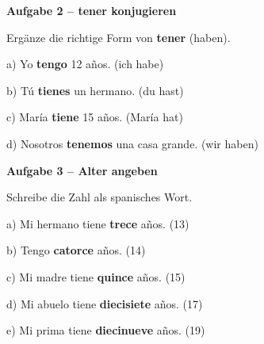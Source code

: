 \documentclass[11pt, a4paper]{article}
\newcommand{\fachfarbe}{spanisch}
\newcommand{\punktebox}[1]{\hfill\fbox{\small \_/#1}}
\newcommand{\lsg}[1]{\textcolor{loesung}{\textbf{#1}}}
\newenvironment{aufgabe}[1]{%
    \needspace{5\baselineskip}%
    \nopagebreak[4]%
    \vspace{10pt}
    \noindent\textbf{\textcolor{\fachfarbe}{Aufgabe #1}}
    \nopagebreak[4]%
    \vspace{5pt}
    \nopagebreak[4]%
    \begin{list}{}{\leftmargin=0pt}
    \item[]
}{%
    \end{list}
}
\newcommand{\es}[1]{\textcolor{\fachfarbe}{\textbf{#1}}}
\begin{document}
\vspace{15pt}


\begin{aufgabe}{2 -- tener konjugieren}
Ergänze die richtige Form von \es{tener} (haben). \punktebox{8}
\end{aufgabe}

\noindent
a) Yo \lsg{tengo} 12 años. \hfill (ich habe)

\vspace{0.8em}

\noindent
b) Tú \lsg{tienes} un hermano. \hfill (du hast)

\vspace{0.8em}

\noindent
c) María \lsg{tiene} 15 años. \hfill (María hat)

\vspace{0.8em}

\noindent
d) Nosotros \lsg{tenemos} una casa grande. \hfill (wir haben)

\vspace{15pt}


\begin{aufgabe}{3 -- Alter angeben}
Schreibe die Zahl als spanisches Wort. \punktebox{10}
\end{aufgabe}

\noindent
a) Mi hermano tiene \lsg{trece} años. \hfill (13)

\vspace{0.8em}

\noindent
b) Tengo \lsg{catorce} años. \hfill (14)

\vspace{0.8em}

\noindent
c) Mi madre tiene \lsg{quince} años. \hfill (15)

\vspace{0.8em}

\noindent
d) Mi abuelo tiene \lsg{diecisiete} años. \hfill (17)

\vspace{0.8em}

\noindent
e) Mi prima tiene \lsg{diecinueve} años. \hfill (19)
\end{document}
